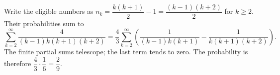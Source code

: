 Write the eligible numbers as $n_k=\dfrac{k(k+1)}{2}-1=\dfrac{(k-1)(k+2)}{2}$ for $k\ge2$. Their probabilities sum to
\[
\sum_{k=2}^{\infty}\dfrac{4}{(k-1)k(k+1)(k+2)}
=\dfrac{4}{3}\sum_{k=2}^{\infty}\left(\dfrac{1}{(k-1)k(k+1)}-\dfrac{1}{k(k+1)(k+2)}\right).
\]
The finite partial sums telescope; the last term tends to zero. The probability is therefore $\dfrac{4}{3}\cdot\dfrac{1}{6}=\boxed{\dfrac{2}{9}}$.
